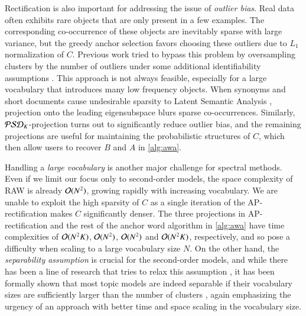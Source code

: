 Rectification is also important for addressing the issue of \textit{outlier
bias}. Real data often exhibits rare objects that are only present in a few
examples. The corresponding co\hyp{}occurrence of these objects are inevitably
sparse with large variance, but the greedy anchor selection favors choosing
these outliers due to $L_1$ normalization of $C$. Previous work tried to
bypass this problem by oversampling clusters by the number of outliers under
some additional identifiability assumptions \cite{gillis2014fast}. This approach
is not always feasible, especially for a large vocabulary that introduces many
low frequency objects. When synonyms and short documents cause undesirable
sparsity to Latent Semantic Analysis \cite{landauer1998introduction}, projection
onto the leading eigensubspace blurs sparse co\hyp{}occurrences. Similarly,
$\mathcal{PSD}_K$\hyp{}projection turns out to significantly reduce outlier bias, and the
remaining projections are useful for maintaining the probabilistic structures of
$C$, which then allow users to recover $B$ and $A$ in \cref{alg:awa}.

Handling a \textit{large vocabulary} is another major challenge for spectral
methods. Even if we limit our focus only to second\hyp{}order models, the space
complexity of RAW is already $\mathcal{O}(N^2)$, growing rapidly with increasing
vocabulary. We are unable to exploit the high sparsity of $C$ as a single
iteration of the AP\hyp{}rectification makes $C$ significantly denser. The three
projections in AP\hyp{}rectification and the rest of the anchor word algorithm
in \cref{alg:awa} have time complexities of $\mathcal{O}(N^2 K)$, $\mathcal{O}(N^2)$, $\mathcal{O}
(N^2)$ and $\mathcal{O}(N^2 K)$, respectively, and so pose a difficulty when scaling to
a large vocabulary size $N$. On the other hand, the \textit{separability
assumption} is crucial for the second\hyp{}order models, and while there has
been a line of research that tries to relax this assumption 
\cite{bansal2014,huang2016}, it has been formally shown that most topic models
are indeed separable if their vocabulary sizes are sufficiently larger than the
number of clusters \cite{ding2015most}, again emphasizing the urgency of an
approach with better time and space scaling in the vocabulary size.
